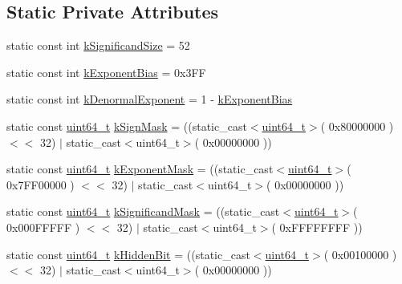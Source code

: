 \subsection*{Static Private Attributes}
\begin{DoxyCompactItemize}
\item 
static const int \mbox{\hyperlink{classrapidjson_1_1internal_1_1_double_a7b3a81a2e3e15d230f023e7598205aa6}{k\+Significand\+Size}} = 52
\item 
static const int \mbox{\hyperlink{classrapidjson_1_1internal_1_1_double_a98d3cd7a5e045d754913d998145dd5db}{k\+Exponent\+Bias}} = 0x3\+FF
\item 
static const int \mbox{\hyperlink{classrapidjson_1_1internal_1_1_double_a7403414a98c493a539adbbc3cb58a1b3}{k\+Denormal\+Exponent}} = 1 -\/ \mbox{\hyperlink{classrapidjson_1_1internal_1_1_double_a98d3cd7a5e045d754913d998145dd5db}{k\+Exponent\+Bias}}
\item 
static const \mbox{\hyperlink{stdint_8h_aec6fcb673ff035718c238c8c9d544c47}{uint64\+\_\+t}} \mbox{\hyperlink{classrapidjson_1_1internal_1_1_double_ace8ae4f049aa47ea645ebf305227cb88}{k\+Sign\+Mask}} = ((static\+\_\+cast$<$\mbox{\hyperlink{stdint_8h_aec6fcb673ff035718c238c8c9d544c47}{uint64\+\_\+t}}$>$( 0x80000000 ) $<$$<$ 32) $\vert$ static\+\_\+cast$<$uint64\+\_\+t$>$( 0x00000000 ))
\item 
static const \mbox{\hyperlink{stdint_8h_aec6fcb673ff035718c238c8c9d544c47}{uint64\+\_\+t}} \mbox{\hyperlink{classrapidjson_1_1internal_1_1_double_a5e4e25bf99c4378e35ce6c435ecfb113}{k\+Exponent\+Mask}} = ((static\+\_\+cast$<$\mbox{\hyperlink{stdint_8h_aec6fcb673ff035718c238c8c9d544c47}{uint64\+\_\+t}}$>$( 0x7\+F\+F00000 ) $<$$<$ 32) $\vert$ static\+\_\+cast$<$uint64\+\_\+t$>$( 0x00000000 ))
\item 
static const \mbox{\hyperlink{stdint_8h_aec6fcb673ff035718c238c8c9d544c47}{uint64\+\_\+t}} \mbox{\hyperlink{classrapidjson_1_1internal_1_1_double_a565ba85ac68c6a78da78b78e53c5326b}{k\+Significand\+Mask}} = ((static\+\_\+cast$<$\mbox{\hyperlink{stdint_8h_aec6fcb673ff035718c238c8c9d544c47}{uint64\+\_\+t}}$>$( 0x000\+F\+F\+F\+F\+F ) $<$$<$ 32) $\vert$ static\+\_\+cast$<$uint64\+\_\+t$>$( 0x\+F\+F\+F\+F\+F\+F\+F\+F ))
\item 
static const \mbox{\hyperlink{stdint_8h_aec6fcb673ff035718c238c8c9d544c47}{uint64\+\_\+t}} \mbox{\hyperlink{classrapidjson_1_1internal_1_1_double_a9a209f4e38c947ba2fe18ca9479ce939}{k\+Hidden\+Bit}} = ((static\+\_\+cast$<$\mbox{\hyperlink{stdint_8h_aec6fcb673ff035718c238c8c9d544c47}{uint64\+\_\+t}}$>$( 0x00100000 ) $<$$<$ 32) $\vert$ static\+\_\+cast$<$uint64\+\_\+t$>$( 0x00000000 ))
\end{DoxyCompactItemize}


